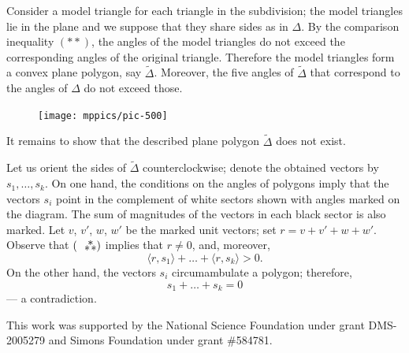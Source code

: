 \documentclass[oneside,a4paper]{amsart}
\begin{document}
Consider a model triangle for each triangle in the subdivision;
the model triangles lie in the plane and we suppose that they share sides as in $\Delta$.
By the comparison inequality $({*}{*})$, the angles of the model triangles do not exceed the corresponding angles of the original triangle.
Therefore the model triangles form a convex plane polygon, say $\tilde\Delta$.
Moreover, the five angles of $\tilde\Delta$ that correspond to the angles of $\Delta$ do not exceed those.

\begin{figure}
\vskip-5mm
\centering
\texttt{[image: mppics/pic-500]}
\vskip-1mm
\end{figure}

It remains to show that the described plane polygon $\tilde\Delta$ does not exist.

Let us orient the sides of $\tilde\Delta$ counterclockwise;
denote the obtained vectors by $s_1,\dots,s_k$.
On one hand, the conditions on the angles of polygons imply that the vectors $s_i$ point in the complement of white sectors shown with angles marked on the diagram.
The sum of magnitudes of the vectors in each black sector is also marked.
Let $v$, $v'$, $w$, $w'$ be the marked unit vectors;
set $r=v+v'+w+w'$.
Observe that $(\asterism)$ implies that $r\ne 0$,
and, moreover, 
\[\langle r,s_1\rangle+\dots+\langle r,s_k\rangle>0.\]
On the other hand, the vectors $s_i$ circumambulate a polygon; therefore, 
\[s_1+\dots+s_k=0\]
--- a contradiction.

{\small {}
This work was supported by the National Science Foundation under grant DMS-2005279 and Simons Foundation under grant \#584781.}



{\sloppy
\printbibliography
\fussy
}
\end{document}
